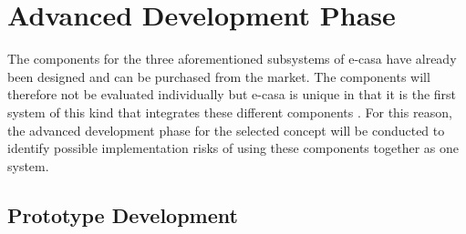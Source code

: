 \documentclass[a4paper,11pt,fleqn]{report}
\begin{document}
\section{Advanced Development Phase}
The components for the three aforementioned subsystems of \ac{e-casa} have already been designed and can be purchased from the market. The components will therefore not be evaluated individually but \ac{e-casa} is unique in that it is the first system of this kind that integrates these different components .
For this reason, the advanced development phase for the selected concept will be conducted to identify possible implementation risks of using these components together as one system.

\subsection{Prototype Development}
%
\end{document}
